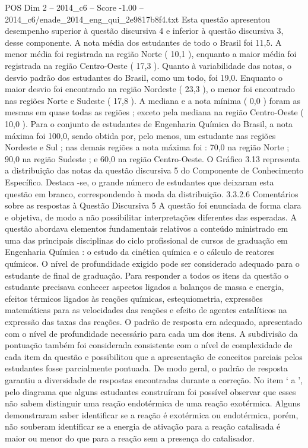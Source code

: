 \begin{textsample}{POS Dim 2 – 2014\_c6 – Score -1.00 – 2014\_c6/enade\_2014\_eng\_qui\_2e9817b8f4.txt}
Esta questão apresentou desempenho superior à questão discursiva 4 e inferior à questão discursiva 3, desse componente.
A nota média dos estudantes de todo o Brasil foi 11,5.
A menor média foi registrada na região Norte ( 10,1 ), enquanto a maior média foi registrada na região Centro-Oeste ( 17,3 ).
Quanto à variabilidade das notas, o desvio padrão dos estudantes do Brasil, como um todo, foi 19,0.
Enquanto o maior desvio foi encontrado na região Nordeste ( 23,3 ), o menor foi encontrado nas regiões Norte e Sudeste ( 17,8 ).
A mediana e a nota mínima ( 0,0 ) foram as mesmas em quase todas as regiões ; exceto pela mediana na região Centro-Oeste ( 10,0 ).
Para o conjunto de estudantes de Engenharia Química do Brasil, a nota máxima foi 100,0, sendo obtida por, pelo menos, um estudante nas regiões Nordeste e Sul ; nas demais regiões a nota máxima foi : 70,0 na região Norte ; 90,0 na região Sudeste ; e 60,0 na região Centro-Oeste.
O Gráfico 3.13 representa a distribuição das notas da questão discursiva 5 do Componente de Conhecimento Específico.
Destaca -se, o grande número de estudantes que deixaram esta questão em branco, correspondendo à moda da distribuição. 3.3.2.6 Comentários sobre as respostas à Questão Discursiva 5 A questão foi enunciada de forma clara e objetiva, de modo a não possibilitar interpretações diferentes das esperadas.
A questão abordava elementos fundamentais relativos a conteúdo ministrado em uma das principais disciplinas do ciclo profissional de cursos de graduação em Engenharia Química : o estudo da cinética química e o cálculo de reatores químicos.
O nível de profundidade exigido pode ser considerado adequado para o estudante de final de graduação.
Para responder a todos os itens da questão o estudante precisava conhecer aspectos ligados a balanços de massa e energia, efeitos térmicos ligados às reações químicas, estequiometria, expressões matemáticas para as velocidades das reações e efeito de agentes catalíticos na expressão das taxas das reações.
O padrão de resposta era adequado, apresentado com o nível de profundidade necessário para cada um dos itens.
A subdivisão da pontuação também foi considerada consistente com o nível de complexidade de cada item da questão e possibilitou que a apresentação de conceitos parciais pelos estudantes fosse parcialmente pontuada.
De modo geral, o padrão de resposta garantiu a diversidade de respostas encontradas durante a correção.
No item ‘ a ’, pelo diagrama que alguns estudantes construíram foi possível observar que esses não sabem distinguir uma reação endotérmica de uma reação exotérmica.
Alguns demonstraram saber identificar se a reação é exotérmica ou endotérmica, porém, não souberam identificar se a energia de ativação para a reação catalisada é maior ou menor do que para a reação sem a presença do catalisador.

\end{textsample}

